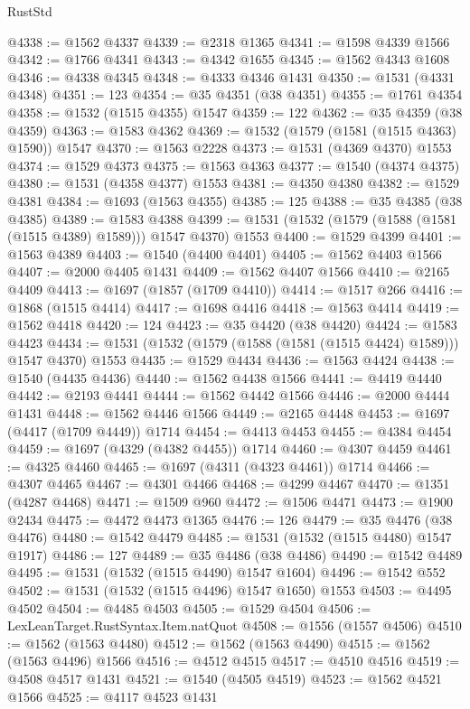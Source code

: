 \begin{lexlean}{RustStd}
\begin{coremodule}
@4338 := @1562 @4337
@4339 := @2318 @1365
@4341 := @1598 @4339 @1566
@4342 := @1766 @4341
@4343 := @4342 @1655
@4345 := @1562 @4343 @1608
@4346 := @4338 @4345
@4348 := @4333 @4346 @1431
@4350 := @1531 (@4331 @4348)
@4351 := 123
@4354 := @35 @4351 (@38 @4351)
@4355 := @1761 @4354
@4358 := @1532 (@1515 @4355) @1547
@4359 := 122
@4362 := @35 @4359 (@38 @4359)
@4363 := @1583 @4362
@4369 := @1532 (@1579 (@1581 (@1515 @4363) @1590)) @1547
@4370 := @1563 @2228
@4373 := @1531 (@4369 @4370) @1553
@4374 := @1529 @4373
@4375 := @1563 @4363
@4377 := @1540 (@4374 @4375)
@4380 := @1531 (@4358 @4377) @1553
@4381 := @4350 @4380
@4382 := @1529 @4381
@4384 := @1693 (@1563 @4355)
@4385 := 125
@4388 := @35 @4385 (@38 @4385)
@4389 := @1583 @4388
@4399 := @1531 (@1532 (@1579 (@1588 (@1581 (@1515 @4389) @1589))) @1547 @4370) @1553
@4400 := @1529 @4399
@4401 := @1563 @4389
@4403 := @1540 (@4400 @4401)
@4405 := @1562 @4403 @1566
@4407 := @2000 @4405 @1431
@4409 := @1562 @4407 @1566
@4410 := @2165 @4409
@4413 := @1697 (@1857 (@1709 @4410))
@4414 := @1517 @266
@4416 := @1868 (@1515 @4414)
@4417 := @1698 @4416
@4418 := @1563 @4414
@4419 := @1562 @4418
@4420 := 124
@4423 := @35 @4420 (@38 @4420)
@4424 := @1583 @4423
@4434 := @1531 (@1532 (@1579 (@1588 (@1581 (@1515 @4424) @1589))) @1547 @4370) @1553
@4435 := @1529 @4434
@4436 := @1563 @4424
@4438 := @1540 (@4435 @4436)
@4440 := @1562 @4438 @1566
@4441 := @4419 @4440
@4442 := @2193 @4441
@4444 := @1562 @4442 @1566
@4446 := @2000 @4444 @1431
@4448 := @1562 @4446 @1566
@4449 := @2165 @4448
@4453 := @1697 (@4417 (@1709 @4449)) @1714
@4454 := @4413 @4453
@4455 := @4384 @4454
@4459 := @1697 (@4329 (@4382 @4455)) @1714
@4460 := @4307 @4459
@4461 := @4325 @4460
@4465 := @1697 (@4311 (@4323 @4461)) @1714
@4466 := @4307 @4465
@4467 := @4301 @4466
@4468 := @4299 @4467
@4470 := @1351 (@4287 @4468)
@4471 := @1509 @960
@4472 := @1506 @4471
@4473 := @1900 @2434
@4475 := @4472 @4473 @1365
@4476 := 126
@4479 := @35 @4476 (@38 @4476)
@4480 := @1542 @4479
@4485 := @1531 (@1532 (@1515 @4480) @1547 @1917)
@4486 := 127
@4489 := @35 @4486 (@38 @4486)
@4490 := @1542 @4489
@4495 := @1531 (@1532 (@1515 @4490) @1547 @1604)
@4496 := @1542 @552
@4502 := @1531 (@1532 (@1515 @4496) @1547 @1650) @1553
@4503 := @4495 @4502
@4504 := @4485 @4503
@4505 := @1529 @4504
@4506 := LexLeanTarget.RustSyntax.Item.natQuot
@4508 := @1556 (@1557 @4506)
@4510 := @1562 (@1563 @4480)
@4512 := @1562 (@1563 @4490)
@4515 := @1562 (@1563 @4496) @1566
@4516 := @4512 @4515
@4517 := @4510 @4516
@4519 := @4508 @4517 @1431
@4521 := @1540 (@4505 @4519)
@4523 := @1562 @4521 @1566
@4525 := @4117 @4523 @1431

\end{coremodule}
\end{lexlean}
